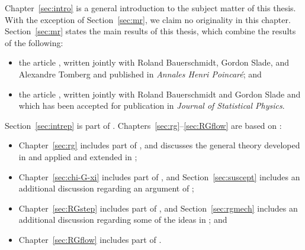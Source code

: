 Chapter~\ref{sec:intro} is a general introduction to the subject matter of this thesis.
With the exception of Section~\ref{sec:mr}, we claim no originality in this chapter.
Section~\ref{sec:mr} states the main results of this thesis, which combine the results
of the following:
\begin{itemize}
\item
the article \cite{BSTW-clp}, written jointly with
Roland Bauerschmidt, Gordon Slade, and Alexandre Tomberg and
published in \textit{Annales Henri Poincar\'{e}};
and

\item
the article \cite{BSW-saw-sa}, written jointly with
Roland Bauerschmidt and Gordon Slade and which has been accepted for publication
in \textit{Journal of Statistical Physics}.
\end{itemize}
Section~\ref{sec:intrep} is part of \cite{BSW-saw-sa}.
Chapters~\ref{sec:rg}--\ref{sec:RGflow} are based on \cite{BSTW-clp,BSW-saw-sa}:
\begin{itemize}
\item
Chapter~\ref{sec:rg} includes part of \cite{BSTW-clp,BSW-saw-sa},
and discusses the general theory developed in
\cite{BS-rg-norm,BS-rg-loc,BBS-rg-pt,BS-rg-IE,BS-rg-step}
and applied and extended in
\cite{BBS-saw4-log,BBS-saw4,ST-phi4};

\item
Chapter~\ref{sec:chi-G-xi} includes part of \cite{BSTW-clp,BSW-saw-sa},
and Section~\ref{sec:suscept} includes an additional discussion regarding an argument
of \cite{BBS-saw4-log};

\item
Chapter~\ref{sec:RGstep} includes part of \cite{BSTW-clp}, and
Section~\ref{sec:rgmech} includes an additional discussion regarding some of the ideas in
\cite{BS-rg-step}; and

\item
Chapter~\ref{sec:RGflow} includes part of \cite{BSW-saw-sa}.
\end{itemize}




